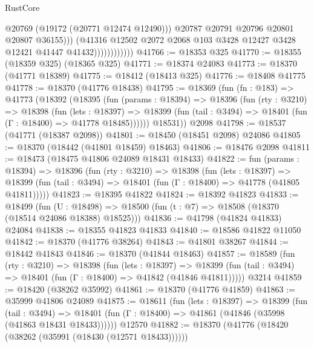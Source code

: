 \begin{lexlean}{RustCore}
\begin{coremodule}
                                  @20769
                                  (@19172 (@20771 @12474 @12490)))
                                @20787
                                @20791
                                @20796
                                @20801
                                @20807
                                @36155)))
                          (@41316
                            @12502
                            @2072
                            @2068
                            @103
                            @3428
                            @12427
                            @3428
                            @12421
                            @41447
                            @41432))))))))))))
@41766 := @18353 @325
@41770 := @18355 (@18359 @325) (@18365 @325)
@41771 := @18374 @24083
@41773 := @18370 (@41771 @18389)
@41775 := @18412 (@18413 @325)
@41776 := @18408 @41775
@41778 := @18370 (@41776 @18438)
@41795 := @18369
    (fun (fn : @183) =>
    @41773
      (@18392
        (@18395
          (fun (params : @18394) =>
          @18396
            (fun (rty : @3210) =>
            @18398
              (fun (lets : @18397) =>
              @18399 (fun (tail : @3494) => @18401 (fun (Γ : @18400) => @41778 @18485))))))
        @18531))
    @2098
@41798 := @18537 (@41771 (@18387 @2098))
@41801 := @18450 (@18451 @2098) @24086
@41805 := @18370 (@18442 (@41801 @18459) @18463)
@41806 := @18476 @2098
@41811 := @18473 (@18475 @41806 @24089 @18431 @18433)
@41822 := fun (params : @18394) =>
  @18396
    (fun (rty : @3210) =>
    @18398
      (fun (lets : @18397) =>
      @18399 (fun (tail : @3494) => @18401 (fun (Γ : @18400) => @41778 (@41805 @41811)))))
@41823 := @18395 @41822
@41824 := @18392 @41823
@41833 := @18499
    (fun (U : @18498) => @18500 (fun (t : @7) => @18508 (@18370 (@18514 @24086 @18388) @18525)))
@41836 := @41798 (@41824 @41833) @24084
@41838 := @18355 @41823 @41833
@41840 := @18586 @41822 @11050
@41842 := @18370 (@41776 @38264)
@41843 := @41801 @38267
@41844 := @18442 @41843
@41846 := @18370 (@41844 @18463)
@41857 := @18589
    (fun (rty : @3210) =>
    @18398
      (fun (lets : @18397) =>
      @18399 (fun (tail : @3494) => @18401 (fun (Γ : @18400) => @41842 (@41846 @41811)))))
    @3214
@41859 := @18420 (@38262 @35992)
@41861 := @18370 (@41776 @41859)
@41863 := @35999 @41806 @24089
@41875 := @18611
    (fun (lets : @18397) =>
    @18399
      (fun (tail : @3494) =>
      @18401 (fun (Γ : @18400) => @41861 (@41846 (@35998 (@41863 @18431 @18433))))))
    @12570
@41882 := @18370 (@41776 (@18420 (@38262 (@35991 (@18430 (@12571 @18433))))))

\end{coremodule}
\end{lexlean}
